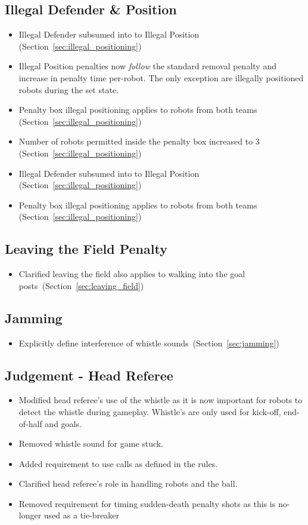 \subsection*{Illegal Defender \& Position}
\begin{itemize}
  \item Illegal Defender subsumed into to Illegal Position (\cf Section~\ref{sec:illegal_positioning})
  \item Illegal Position penalties now \textit{follow} the standard removal penalty and increase in penalty time per-robot. The only exception are illegally positioned robots during the set state.
  \item Penalty box illegal positioning applies to robots from both teams (\cf Section~\ref{sec:illegal_positioning})
  \item Number of robots permitted inside the penalty box increased to 3 (\cf Section~\ref{sec:illegal_positioning})
  \item Illegal Defender subsumed into to Illegal Position (\cf Section~\ref{sec:illegal_positioning})
  \item Penalty box illegal positioning applies to robots from both teams (\cf Section~\ref{sec:illegal_positioning})
\end{itemize}

\subsection*{Leaving the Field Penalty}
\begin{itemize}
  \item Clarified leaving the field also applies to walking into the goal posts~(\cf Section~\ref{sec:leaving_field})
\end{itemize}

\subsection*{Jamming}
\begin{itemize}
  \item Explicitly define interference of whistle sounds~(\cf Section~\ref{sec:jamming})
\end{itemize}

\subsection*{Judgement - Head Referee}
\begin{itemize}
  \item Modified head referee's use of the whistle as it is now important for robots to detect the whistle during gameplay. Whistle's are only used for kick-off, end-of-half and goals.
  \item Removed whistle sound for game stuck.
  \item Added requirement to use calls as defined in the rules.
  \item Clarified head referee's role in handling robots and the ball.
  \item Removed requirement for timing sudden-death penalty shots as this is no-longer used as a tie-breaker
\end{itemize}

